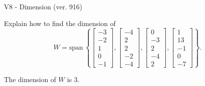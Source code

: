 \begin{exercise}
  \begin{exerciseTitle}V8 - Dimension (ver. 916)\end{exerciseTitle}
  \begin{exerciseStatement}
    Explain how to find the dimension of 
\[W=\mathrm{span}\ \left\{\left[\begin{array}{r}
-3 \\
-2 \\
1 \\
0 \\
-1
\end{array}\right] , \left[\begin{array}{r}
-4 \\
2 \\
2 \\
-2 \\
-4
\end{array}\right] , \left[\begin{array}{r}
0 \\
-3 \\
2 \\
-4 \\
2
\end{array}\right] , \left[\begin{array}{r}
1 \\
13 \\
-1 \\
0 \\
-7
\end{array}\right]\right\}.\]



  \end{exerciseStatement}
  \begin{exerciseAnswer}
   The dimension of \(W\) is  \(3\).
  


  \end{exerciseAnswer}
\end{exercise}